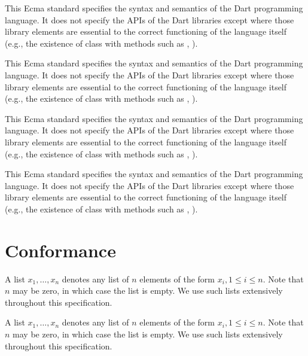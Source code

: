 \documentclass{article}
\begin{document}
\LMHash{}
This Ecma standard specifies the syntax and semantics of the Dart programming language.  It does not specify the APIs of the Dart libraries except where those library elements are  essential to the correct functioning of the language itself (e.g., the existence of class  with methods such as , ).

\LMHash{}
This Ecma standard specifies the syntax and semantics of the Dart programming language.  It does not specify the APIs of the  Dart libraries except where those library elements are essential to the correct functioning of the language itself (e.g., the existence of class  with methods such as , ).

\LMHash{}
This Ecma standard specifies  the syntax and semantics of the Dart programming language.  It does not specify the APIs of the Dart libraries except where those library elements are essential to the correct functioning of the language itself (e.g., the existence of class  with methods such as , ).

\LMHash{}
This Ecma         standard 		specifies the syntax  and semantics of the Dart programming language.  It does not specify the APIs of the
             Dart libraries except where those library elements are
essential to the correct functioning of
the language itself (e.g., the existence of class
 with methods such as , ).





\section{Conformance}


\LMHash{}
A list $x_1, \ldots, x_n$ denotes any list of $n$ elements of the form $x_i, 1 \le i \le n$. Note that $n$ may be zero, in which case the list is empty. We use such lists extensively throughout this specification.

\LMHash{}
A list $x_1,        \ldots,      x_n$ denotes any list of $n$ elements of the form $x_i, 1 \le i \le n$. Note that $n$ may be zero, in which case the list is empty. We use such lists extensively throughout this specification.
\end{document}
